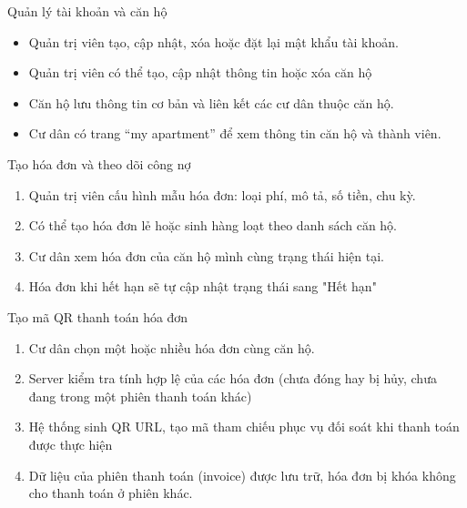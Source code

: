 \documentclass[t, aspectratio=169]{beamer}
\begin{document}
\begin{frame}{Quản lý tài khoản và căn hộ}

\begin{itemize}
  \item Quản trị viên tạo, cập nhật, xóa hoặc đặt lại mật khẩu tài khoản.
  \item Quản trị viên có thể tạo, cập nhật thông tin hoặc xóa căn hộ
  \item Căn hộ lưu thông tin cơ bản và liên kết các cư dân thuộc căn hộ.
  \item Cư dân có trang ``my apartment'' để xem thông tin căn hộ và thành viên.
\end{itemize}

\end{frame}

\begin{frame}{Tạo hóa đơn và theo dõi công nợ}

\begin{enumerate}
  \item Quản trị viên cấu hình mẫu hóa đơn: loại phí, mô tả, số tiền, chu kỳ.
  \item Có thể tạo hóa đơn lẻ hoặc sinh hàng loạt theo danh sách căn hộ.
  \item Cư dân xem hóa đơn của căn hộ mình cùng trạng thái hiện tại.
  \item Hóa đơn khi hết hạn sẽ tự cập nhật trạng thái sang "Hết hạn"
\end{enumerate}

\end{frame}

\begin{frame}{Tạo mã QR thanh toán hóa đơn}

\begin{enumerate}
  \item Cư dân chọn một hoặc nhiều hóa đơn cùng căn hộ.
  \item Server kiểm tra tính hợp lệ của các hóa đơn (chưa đóng hay bị hủy, chưa đang trong một phiên thanh toán khác)
  \item Hệ thống sinh QR URL, tạo mã tham chiếu phục vụ đối soát khi thanh toán được thực hiện
  \item Dữ liệu của phiên thanh toán (invoice) được lưu trữ, hóa đơn bị khóa không cho thanh toán ở phiên khác.
\end{enumerate}

\end{frame}
\end{document}
